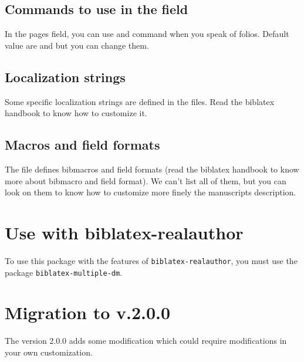 \documentclass{ltxdockit}[2011/03/25]
\newcommand{\biblatex}{biblatex\xspace}
\begin{document}
\subsection{Commands to use in the  field}

In the pages field, you can use  and  command when you speak of folios. Default value are  and  but you can change them.

\subsection{Localization strings}

Some specific localization strings are defined in the  files. Read the \biblatex handbook to know how to customize it.

\subsection{Macros and field formats}

The  file defines bibmacros and field formats (read the \biblatex handbook to know more about bibmacro and field format). We can't list all of them, but you can look on them to know how to customize more finely the manuscripts description.

\section{Use with biblatex-realauthor}\label{biblatex-multiple-dm}

To use this package with the features of \verb+biblatex-realauthor+, you must use the package \verb+biblatex-multiple-dm+.

\section{Migration to v.2.0.0}

The version 2.0.0 adds some modification which could require modifications in your own customization.
\end{document}
